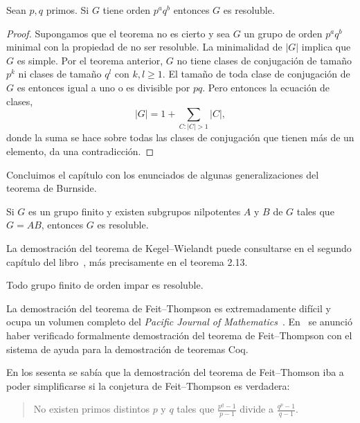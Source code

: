\begin{theorem}[Burnside]
  Sean $p,q$ primos. Si $G$ tiene orden $p^aq^b$ entonces $G$ es resoluble.
\end{theorem}

\begin{proof}
	Supongamos que el teorema no es cierto y sea $G$ un grupo de orden $p^aq^b$
	minimal con la propiedad de no ser resoluble. La minimalidad de $|G|$
	implica que $G$ es simple. Por el teorema anterior, $G$ no tiene clases de
	conjugación de tamaño $p^k$ ni clases de tamaño $q^l$ con $k,l\geq1$. El
	tamaño de toda clase de conjugación de $G$ es entonces igual a uno o es
	divisible por $pq$. Pero entonces la ecuación de clases, 
	\[
		|G|=1+\sum_{C:|C|>1}|C|,
	\]
	donde la suma se hace sobre todas las clases de conjugación que tienen más
	de un elemento, da una contradicción.
\end{proof}

Concluimos el capítulo con los enunciados de algunas 
generalizaciones del teorema de Burnside. 

\begin{theorem}
Si $G$ es un grupo finito y existen subgrupos nilpotentes $A$ y $B$ de $G$ tales
que $G=AB$, entonces $G$ es resoluble. 
\end{theorem}

La demostración del teorema de Kegel--Wielandt puede consultarse en el segundo 
capítulo del libro~\cite{MR1211633}, más precisamente en el teorema 2.13. 

\begin{theorem}
Todo grupo finito de orden impar es resoluble. 
\end{theorem}

La demostración del teorema de Feit--Thompson es extremadamente difícil y ocupa un volumen completo del 
\emph{Pacific Journal of Mathematics}~\cite{MR166261}. 
En~\cite{MR3111271} se anunció haber verificado formalmente 
demostración del teorema de Feit--Thompson con el 
sistema de ayuda para la demostración de teoremas Coq. 

\medskip
{}
En los sesenta se sabía que la demostración del teorema de Feit--Thomson iba a poder simplificarse 
si la conjetura de Feit--Thompson es verdadera:

\begin{quote}
No existen primos distintos $p$ y $q$ tales que
$\frac {p^{q}-1}{p-1}$ divide a $\frac{q^{p} - 1}{q - 1}$. 
\end{quote}

